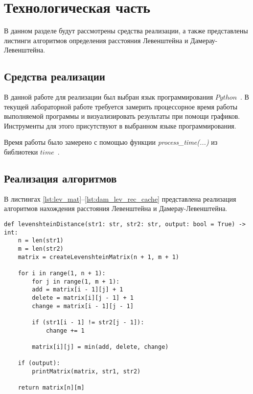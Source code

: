\chapter{Технологическая часть}

В данном разделе будут рассмотрены средства реализации, а также представлены листинги алгоритмов определения расстояния Левенштейна и Дамерау-Левенштейна.

\section{Средства реализации}
В данной работе для реализации был выбран язык программирования $Python$~\cite{python-lang}. В текущей лабораторной работе требуется замерить процессорное время работы выполняемой программы
и визуализировать результаты при помощи графиков. Инструменты для этого присутствуют в выбранном языке программирования.

Время работы было замерено с помощью функции \textit{process\_time(...)} из библиотеки $time$~\cite{python-lang-time}.


\section{Реализация алгоритмов}

В листингах \ref{lst:lev_mat}--\ref{lst:dam_lev_rec_cache} представлена реализация алгоритмов нахождения расстояния Левенштейна и Дамерау-Левенштейна.

\clearpage

\begin{center}
    \captionsetup{justification=raggedright,singlelinecheck=off}
    \begin{lstlisting}[label=lst:lev_mat,caption=Реализация алгоритма нахождения расстояния Левенштейна (матричный)]
def levenshteinDistance(str1: str, str2: str, output: bool = True) -> int:
	n = len(str1)
	m = len(str2)
	matrix = createLevenshteinMatrix(n + 1, m + 1)
	
	for i in range(1, n + 1):
		for j in range(1, m + 1):
		add = matrix[i - 1][j] + 1
		delete = matrix[i][j - 1] + 1
		change = matrix[i - 1][j - 1]
		
		if (str1[i - 1] != str2[j - 1]):
			change += 1
		
		matrix[i][j] = min(add, delete, change)
	
	if (output):
		printMatrix(matrix, str1, str2)
	
	return matrix[n][m]
\end{lstlisting}
\end{center}


